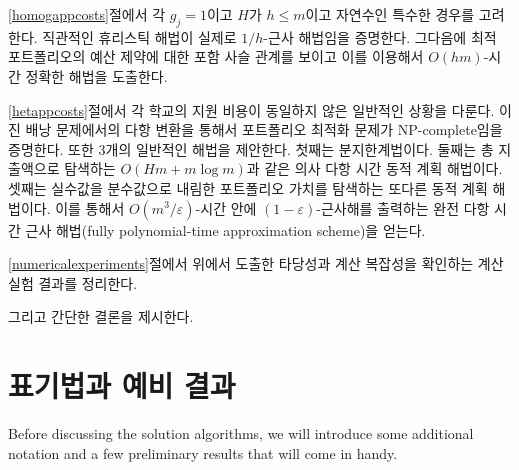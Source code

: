 \documentclass[11pt]{article} %
\newif\ifen
\theoremstyle{definition}
\theoremstyle{definition}
\begin{document}
\ifen
In section \ref{homogappcosts}, we consider the special case where each $g_j = 1$ and $H$ is an integer $h \leq m$.  We show that an intuitive heuristic is in fact a $1/h$-approximation algorithm. Then, we show that the optimal portfolios are nested in the budget constraint, which yields an exact algorithm that runs in $O(hm)$-time.
\else
\ref{homogappcosts}절에서 각 $g_j = 1$이고 $H$가 $h \leq m$이고 자연수인 특수한 경우를 고려한다. 직관적인 휴리스틱 해법이 실제로 $1/h$-근사 해법임을 증명한다. 그다음에 최적 포트폴리오의 예산 제약에 대한 포함 사슬 관계를 보이고 이를 이용해서 $O(hm)$-시간 정확한 해법을 도출한다.
\fi

\ifen
In section \ref{hetappcosts}, we turn to the scenario in which colleges differ in their application fees. We show that the decision form of the portfolio optimization problem is NP-complete through a polynomial reduction from the binary knapsack problem. We provide three algorithms for this more general setup. The first is a branch-and-bound routine. The second is a dynamic program that iterates on total expenditures and produces an exact solution in pseudopolynomial time, namely $O(Hm + m \log m)$. The third is a different dynamic program that iterates on truncated portfolio valuations. It yields a fully polynomial-time approximation scheme that produces a $(1 - \varepsilon)$-optimal solution in $O(m^3 / \varepsilon)$ time.  
\else
\ref{hetappcosts}절에서 각 학교의 지원 비용이 동일하지 않은 일반적인 상황을 다룬다. 이진 배낭 문제에서의 다항 변환을 통해서 포트폴리오 최적화 문제가 NP-complete임을 증명한다. 또한 3개의 일반적인 해법을 제안한다. 첫째는 분지한계법이다. 둘째는 총 지출액으로 탐색하는 $O(Hm + m \log m)$과 같은 의사 다항 시간 동적 계획 해법이다. 셋째는 실수값을 분수값으로 내림한 포트폴리오 가치를 탐색하는 또다른 동적 계획 해법이다. 이를 통해서 $O(m^3 / \varepsilon)$-시간 안에 $(1 - \varepsilon)$-근사해를 출력하는 완전 다항 시간 근사 해법(fully polynomial-time approximation scheme)을 얻는다.
\fi

\ifen
In section \ref{numericalexperiments}, we present the results of computational experiments that confirm the validity and time complexity results established in the previous two sections.

A brief conclusion follows.
\else
\ref{numericalexperiments}절에서 위에서 도출한 타당성과 계산 복잡성을 확인하는 계산 실험 결과를 정리한다. 

그리고 간단한 결론을 제시한다.
\fi



\pagebreak
\ifen \section{Notation and preliminary results} \else \section{표기법과 예비 결과}\fi\label{preliminaries}
\ifen Before discussing the solution algorithms, we will introduce some additional notation and a few preliminary results that will come in handy.
\end{document}
